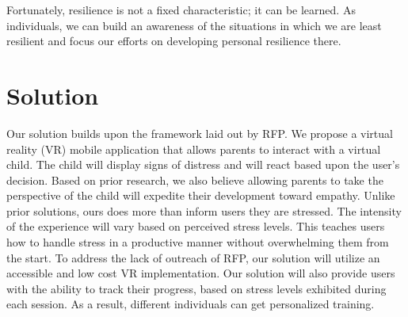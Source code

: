 Fortunately, resilience is not a fixed characteristic; it can be learned. 
As individuals, we can build an awareness of the situations in which we are least resilient and focus our efforts on developing personal resilience there. 

\section{Solution}

Our solution builds upon the framework laid out by RFP. We propose a virtual reality (VR) mobile application that allows parents to interact with a virtual child. 
The child will display signs of distress and will react based upon the user's decision. 
Based on prior research, we also believe allowing parents to take the perspective of the child will expedite their development toward empathy. 
Unlike prior solutions, ours does more than inform users they are stressed. 
The intensity of the experience will vary based on perceived stress levels.
This teaches users how to handle stress in a productive manner without overwhelming them from the start.
To address the lack of outreach of RFP, our solution will utilize an accessible and low cost VR implementation.
Our solution will also provide users with the ability to track their progress, based on stress levels exhibited during each session.
As a result, different individuals can get personalized training.
